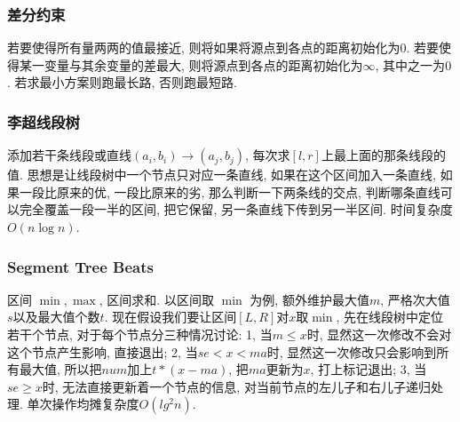 \subsubsection{差分约束}若要使得所有量两两的值最接近, 则将如果将源点到各点的距离初始化为$0$.  若要使得某一变量与其余变量的差最大, 则将源点到各点的距离初始化为$∞$, 其中之一为$0$.  若求最小方案则跑最长路, 否则跑最短路. 
\begin{comment}
\subsubsection{斯坦纳树}\
		在一个无向带权图$G=(V,E)$中, 将指定的$k$个点连通的一颗树称为\textbf{斯坦纳树}, 边权总和最小的斯坦纳树称为最小斯坦纳树. 
		\par 我们可以用DP+SPFA的方法求解斯坦纳树. 用$F_{i,state}$表示以$i$为根, 指定集合中的点的联通状态为$state$的生成树的最小总权值, 有两种转移方程. 
		\par 第一种, 通过两个子集合并进行转移, 即$F_{i,state}=min(F_{i,subset1} + F_{i,subset2})$, 这一部分使用DP完成. 
		\par 第二种, 在当前的联通状态下, 对该联通状态进行松弛操作, 即${F_{i,state}=min(F_{i,state},F_{j,state}+w(i,j))}$, 这一部分使用SPFA完成. 
        \par 时间复杂度$O(V*3^k+cE*2^k)$, $c$为SPFA复杂度中的常数. 
\end{comment}
\subsubsection{李超线段树}
        添加若干条线段或直线$(a_i,b_i)\to (a_j,b_j)$, 每次求$[l,r]$上最上面的那条线段的值. 思想是让线段树中一个节点只对应一条直线, 如果在这个区间加入一条直线, 如果一段比原来的优, 一段比原来的劣, 那么判断一下两条线的交点, 判断哪条直线可以完全覆盖一段一半的区间, 把它保留, 另一条直线下传到另一半区间. 时间复杂度$O(n \log n)$. 
\subsubsection{Segment Tree Beats}
        区间 $\min, \max$, 区间求和. 以区间取 $\min$ 为例, 额外维护最大值$m$, 严格次大值$s$以及最大值个数$t$. 现在假设我们要让区间$[L,R]$对$x$取$\min$, 先在线段树中定位若干个节点, 对于每个节点分三种情况讨论: 1, 当$m\leq x$时, 显然这一次修改不会对这个节点产生影响, 直接退出; 2, 当$se<x<ma$时, 显然这一次修改只会影响到所有最大值, 所以把$num$加上$t*(x-ma)$, 把$ma$更新为$x$, 打上标记退出; 3, 当$se\geq x$时, 无法直接更新着一个节点的信息, 对当前节点的左儿子和右儿子递归处理. 单次操作均摊复杂度$O(lg^2n)$. 

